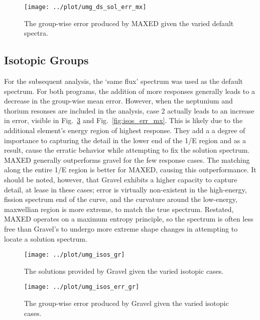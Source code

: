 \documentclass[journal]{IEEEtran}
\newcommand{\FIG}[1]{Fig.~\ref{#1}}               %
\begin{document}
\begin{figure}[h!tb]
  \centering
  \texttt{[image: ../plot/umg\_ds\_sol\_err\_mx]}
  \caption{The group-wise error produced by MAXED given the varied default spectra.}
  \label{fig:ds_err_mx}
\end{figure}


\subsection{Isotopic Groups}

For the subsequent analysis, the `same flux' spectrum was used as the default spectrum.
For both programs, the addition of more responses generally leads to a decrease in the group-wise mean error.
However, when the neptunium and thorium resonses are included in the analysis, case 2 actually leads to an increase in error, visible in \FIG{fig:isos_err_gr} and \FIG{fig:isos_err_mx}.
This is likely due to the additional element's energy region of highest response.
They add a a degree of importance to capturing the detail in the lower end of the 1/E region and as a result, cause the erratic behavior while attempting to fix the solution spectrum.
MAXED generally outperforms gravel for the few response cases.
The matching along the entire 1/E region is better for MAXED, causing this outperformance.
It should be noted, however, that Gravel exhibits a higher capacity to capture detail, at lease in these cases; error is virtually non-existent in the high-energy, fission spectrum end of the curve, and the curvature around the low-energy, maxwellian region is more extreme, to match the true spectrum.
Restated, MAXED operates on a maximum entropy principle, so the spectrum is often less free than Gravel's to undergo more extreme shape changes in attempting to locate a solution spectrum.



\begin{figure}[h!tb]
  \centering
  \texttt{[image: ../plot/umg\_isos\_gr]}
  \caption{The solutions provided by Gravel given the varied isotopic cases.}
  \label{fig:isos_gr}
\end{figure}

\begin{figure}[h!tb]
  \centering
  \texttt{[image: ../plot/umg\_isos\_err\_gr]}
  \caption{The group-wise error produced by Gravel given the varied isotopic cases.}
  \label{fig:isos_err_gr}
\end{figure}
\end{document}

